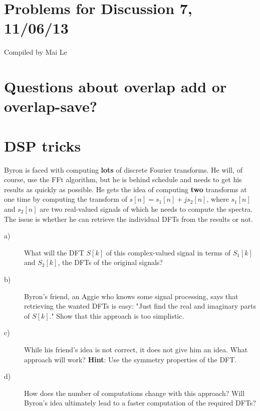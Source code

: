 \documentclass[11pt]{article}
\begin{document}
{\small
\section*{Problems for Discussion 7, 11/06/13}
Compiled by Mai Le
}

\section{Questions about overlap add or overlap-save?}

\section{DSP tricks}
Byron is faced with computing \textbf{lots} of discrete Fourier transforms. He will, of course, use the FFt algorithm, but he is behind schedule and needs to get his results as quickly as possible. He gets the idea of computing \textbf{two} transforms at one time by computing the transform of $s[n]=s_1[n]+j s_2[n]$, where $s_1[n]$ and $s_2[n]$ are two real-valued signals of which he needs to compute the spectra. The issue is whether he can retrieve the individual DFTs from the results or not.

\begin{description}
\item[a)] What will the DFT $S[k]$ of this complex-valued signal in terms of $S_1[k]$ and $S_2[k]$, the DFTs of the original signals?
\item[b)] Byron's friend, an Aggie who knows some signal processing, says that retrieving the wanted DFTs is easy: "Just find the real and imaginary parts of $S[k]$." Show that this approach is too simplistic.
\item[c)] While his friend's idea is not correct, it does not give him an idea. What approach will work? \textbf{Hint}: Use the symmetry properties of the DFT.
\item[d)] How does the number of computations change with this approach? Will Byron's idea ultimately lead to a faster computation of the required DFTs?
\end{description}
\end{document}

